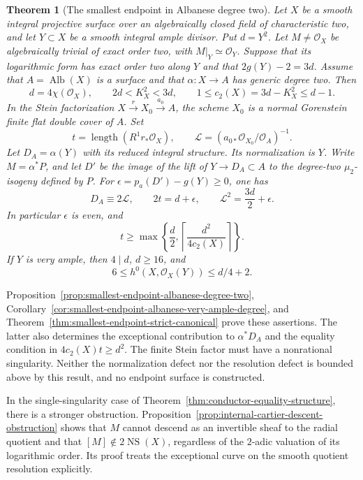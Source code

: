 \documentclass[11pt]{article}
\newtheorem{theorem}{Theorem}[section]
\theoremstyle{remark}\newtheorem{remark}[theorem]{Remark}
\newcommand{\OO}{\mathcal O}
\begin{document}
\begin{theorem}[The smallest endpoint in Albanese degree two]
\label{thm:smallest-endpoint-albanese-summary}
Let $X$ be a smooth integral projective surface over an algebraically
closed field of characteristic two, and let $Y\subset X$ be a smooth
integral ample divisor.  Put $d=Y^2$.
Let $M\ne\OO_X$ be algebraically trivial of exact order two,
with $M|_Y\simeq\OO_Y$.  Suppose that its logarithmic form has
exact order two along $Y$ and that $2g(Y)-2=3d$.
Assume that $A=\operatorname{Alb}(X)$ is a surface and that
$\alpha:X\to A$ has generic degree two.
Then
\[
 d=4\chi(\OO_X),\qquad 2d<K_X^2<3d,\qquad
 1\le c_2(X)=3d-K_X^2\le d-1.
\]
In the Stein factorization $X\xrightarrow{r}X_0\xrightarrow{a_0}A$,
the scheme $X_0$ is a normal Gorenstein finite flat double cover of $A$.
Set
\[
 t=\operatorname{length}(R^1r_*\OO_X),\qquad
 \mathcal L=(a_{0*}\OO_{X_0}/\OO_A)^{-1}.
\]
Let $D_A=\alpha(Y)$ with its reduced integral structure.
Its normalization is $Y$.
Write $M=\alpha^*P$, and let $D'$ be the image of the lift of
$Y\to D_A\subset A$ to the degree-two $\mu_2$-isogeny defined by $P$.
For $\epsilon=p_a(D')-g(Y)\ge0$, one has
\[
 D_A\equiv2\mathcal L,\qquad
 2t=d+\epsilon,\qquad
 \mathcal L^2=\frac{3d}{2}+\epsilon.
\]
In particular $\epsilon$ is even, and
\[
 t\ge\max\left\{\frac d2,
       \left\lceil\frac{d^2}{4c_2(X)}\right\rceil\right\}.
\]
If $Y$ is very ample, then $4\mid d$, $d\ge16$, and
\[
 6\le h^0(X,\OO_X(Y))\le d/4+2.
\]
\end{theorem}

Proposition~\ref{prop:smallest-endpoint-albanese-degree-two},
Corollary~\ref{cor:smallest-endpoint-albanese-very-ample-degree},
and Theorem~\ref{thm:smallest-endpoint-strict-canonical}
prove these assertions.
The latter also determines the exceptional contribution to
$\alpha^*D_A$ and the equality condition in $4c_2(X)t\ge d^2$.
The finite Stein factor must have a nonrational singularity.
Neither the normalization defect nor the resolution defect is
bounded above by this result, and no endpoint surface is constructed.

In the single-singularity case of
Theorem~\ref{thm:conductor-equality-structure}, there is a stronger
obstruction. Proposition~\ref{prop:internal-cartier-descent-obstruction}
shows that $M$ cannot descend as an invertible sheaf to the radial
quotient and that $[M]\notin2\operatorname{NS}(X)$, regardless of
the $2$-adic valuation of its logarithmic order. Its proof treats the
exceptional curve on the smooth quotient resolution explicitly.
\end{document}
